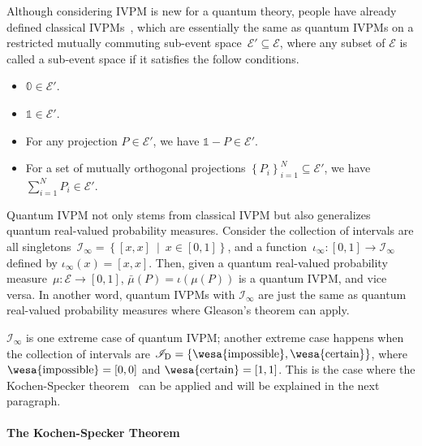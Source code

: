 \documentclass[english,reprint, aps, prl,superscriptaddress, showpacs,
showkeys, longbibliography, amsmath, amssymb]{revtex4-1}
\theoremstyle{plain}
\theoremstyle{definition}
\newcommand{\events}{\ensuremath{\mathcal{E}}}
\newcommand{\imposs}{{\text{\wesa{impossible}}}}
\newcommand{\necess}{{\text{\wesa{certain}}}}
\newcommand{\set}[2]{\ensuremath{\left\{ {#1}~\middle|~{#2}\right\} }}
\begin{document}
Although considering IVPM is new for a quantum theory, people have
already defined classical IVPMs~\cite{JamisonLodwick2004}, which
are essentially the same as quantum IVPMs on a restricted mutually
commuting sub-event space~$\events'\subseteq\events$, where any
subset of $\events$ is called a sub-event space if it satisfies the
follow conditions. 
\begin{itemize}
\item $\mathbb{0}\in\events'$. 
\item $\mathbb{1}\in\events'$. 
\item For any projection $P\in\events'$, we have $\mathbb{1}-P\in\events'$. 
\item For a set of mutually orthogonal projections $\left\{ P_{i}\right\} _{i=1}^{N}\subseteq\events'$,
we have $\sum_{i=1}^{N}P_{i}\in\events'$. 
\end{itemize}
Quantum IVPM not only stems from classical IVPM but also generalizes
quantum real-valued probability measures. Consider the collection
of intervals are all singletons~$\mathscr{I}_{\infty}=\set{\left[x,x\right]}{x\in\left[0,1\right]}$,
and a function~$\iota_{\infty}:\left[0,1\right]\rightarrow\mathscr{I}_{\infty}$
defined by $\iota_{\infty}\left(x\right)=\left[x,x\right]$. Then,
given a quantum real-valued probability measure~$\mu:\events\rightarrow\left[0,1\right]$,
$\bar{\mu}(P)=\iota\left(\mu(P)\right)$ is a quantum IVPM, and vice
versa. In another word, quantum IVPMs with $\mathscr{I}_{\infty}$
are just the same as quantum real-valued probability measures where
Gleason's theorem can apply.

$\mathscr{I}_{\infty}$ is one extreme case of quantum IVPM; another
extreme case happens when the collection of intervals are $\mathscr{I}_{\mathrm{D}}=\left\{ \imposs,\necess\right\} $,
where $\imposs=\left[0,0\right]$ and $\necess=\left[1,1\right]$.
This is the case where the Kochen-Specker theorem~\cite{kochenspecker1967,peres1995quantum,Redhead1987-REDINA}
can be applied and will be explained in the next paragraph.

\paragraph{The Kochen-Specker Theorem}
\end{document}
